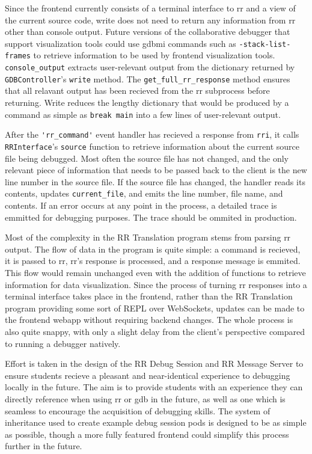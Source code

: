 \documentclass[12pt]{article}
\begin{document}
Since the frontend currently consists of a terminal interface to rr
and a view of the current source code, write does not need to return
any information from rr other than console output.  Future versions of
the collaborative debugger that support visualization tools could use
gdbmi commands such as \lstinline{-stack-list-frames} to retrieve
information to be used by frontend visualization tools.
\lstinline{console_output} extracts user-relevant output from the
dictionary returned by \lstinline{GDBController}'s \lstinline{write}
method.  The \lstinline{get_full_rr_response} method ensures that all
relavant output has been recieved from the rr subprocess before
returning.  Write reduces the lengthy dictionary that would be
produced by a command as simple as \lstinline{break main} into a few
lines of user-relevant output.
\par

After the \lstinline{'rr_command'} event handler has recieved a
response from \lstinline{rri}, it calls \lstinline{RRInterface}'s
\lstinline{source} function to retrieve information about the current
source file being debugged.  Most often the source file has not
changed, and the only relevant piece of information that needs to be
passed back to the client is the new line number in the source file.
If the source file has changed, the handler reads its contents,
updates \lstinline{current_file}, and emits the line number, file
name, and contents.  If an error occurs at any point in the process, a
detailed trace is emmitted for debugging purposes.  The trace should
be ommited in production.
\par

Most of the complexity in the RR Translation program stems from
parsing rr output.  The flow of data in the program is quite simple: a
command is recieved, it is passed to rr, rr's response is processed,
and a response message is emmited.  This flow would remain unchanged
even with the addition of functions to retrieve information for data
visualization.  Since the process of turning rr responses into a
terminal interface takes place in the frontend, rather than the RR
Translation program providing some sort of REPL over WebSockets,
updates can be made to the frontend webapp without requiring backend
changes.  The whole process is also quite snappy, with only a slight
delay from the client's perspective compared to running a debugger
natively.
\par

Effort is taken in the design of the RR Debug Session and RR Message
Server to ensure students recieve a pleasant and near-identical
experience to debugging locally in the future.  The aim is to provide
students with an experience they can directly reference when using rr
or gdb in the future, as well as one which is seamless to encourage
the acquisition of debugging skills.  The system of inheritance used
to create example debug session pods is designed to be as simple as
possible, though a more fully featured frontend could simplify this
process further in the future.
\end{document}
